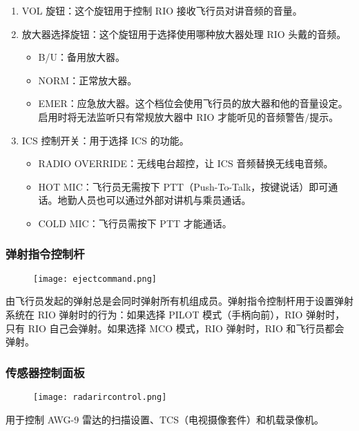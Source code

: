 \begin{enumerate}
	\item VOL 旋钮：这个旋钮用于控制 RIO 接收飞行员对讲音频的音量。
	\item 放大器选择旋钮：这个旋钮用于选择使用哪种放大器处理 RIO 头戴的音频。
	      \begin{itemize}
		      \item B/U：备用放大器。
		      \item NORM：正常放大器。
		      \item EMER：应急放大器。这个档位会使用飞行员的放大器和他的音量设定。启用时将无法监听只有常规放大器中 RIO 才能听见的音频警告/提示。
	      \end{itemize}
	\item ICS 控制开关：用于选择 ICS 的功能。
	      \begin{itemize}
		      \item RADIO OVERRIDE：无线电台超控，让 ICS 音频替换无线电音频。
		      \item HOT MIC：飞行员无需按下 PTT（Push-To-Talk，按键说话）即可通话。地勤人员也可以通过外部对讲机与乘员通话。
		      \item COLD MIC：飞行员需按下 PTT 才能通话。
	      \end{itemize}
\end{enumerate}

\subsubsection{弹射指令控制杆}
\begin{figure}[htb]
	\centering
	\texttt{[image: ejectcommand.png]}
\end{figure}
由飞行员发起的弹射总是会同时弹射所有机组成员。弹射指令控制杆用于设置弹射系统在 RIO 弹射时的行为：如果选择 PILOT 模式（手柄向前），RIO 弹射时，只有 RIO 自己会弹射。如果选择 MCO 模式，RIO 弹射时，RIO 和飞行员都会弹射。

\subsubsection{传感器控制面板}
\begin{figure}[htb]
	\centering
	\texttt{[image: radarircontrol.png]}
\end{figure}
用于控制 AWG-9 雷达的扫描设置、TCS（电视摄像套件）和机载录像机。

